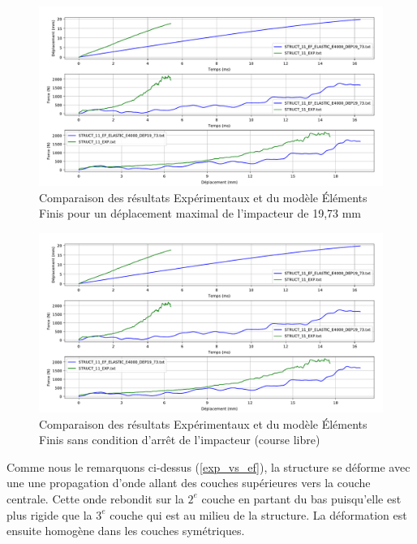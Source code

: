 \documentclass[a4paper]{article}
\begin{document}
	\begin{figure}[H]
		\centering
		\includegraphics[width=15.5cm]{Images/8/8_3/comparaison_EXP_EF_ELASTIC_E4000_DEP19_73.pdf}
		\caption{Comparaison des résultats Expérimentaux et du modèle Éléments Finis pour un déplacement maximal de l'impacteur de 19,73 mm}
	\end{figure}
	
	\begin{figure}[H]
		\centering
		\includegraphics[width=15.5cm]{Images/8/8_3/comparaison_EXP_EF_ELASTIC_E4000_DEP19_73.pdf}
		\caption{Comparaison des résultats Expérimentaux et du modèle Éléments Finis sans condition d'arrêt de l'impacteur (course libre)}
	\end{figure}
	
	\hspace{0.5cm}Comme nous le remarquons ci-dessus (\ref{exp_vs_ef}), la structure se déforme avec une une propagation d'onde allant des couches supérieures vers la couche centrale. Cette onde rebondit sur la $2^{e}$ couche en partant du bas puisqu'elle est plus rigide que la $3^{e}$ couche qui est au milieu de la structure. La déformation est ensuite homogène dans les couches symétriques.\\
	
\end{document}

